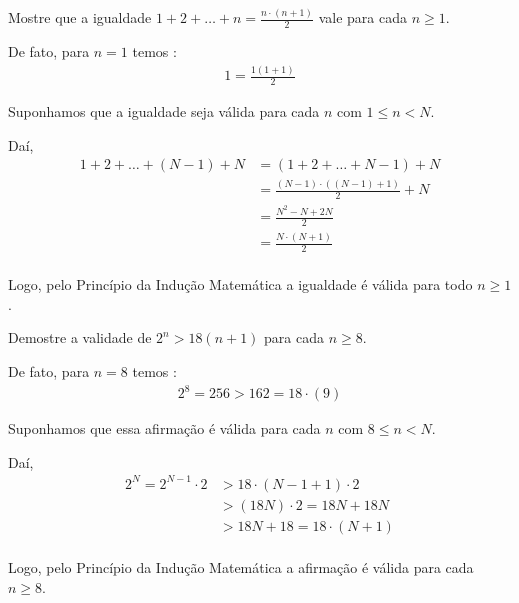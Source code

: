 \begin{exemplo}
Mostre que a igualdade $1+2+\dots+n=\tfrac{n\cdot(n+1)}{2}$ vale para cada $n\ge1$.
\end{exemplo}

De fato, para $n=1$ temos :
\begin{align*}
1 = \frac{1(1+1)}{2}
\end{align*}

Suponhamos que a igualdade seja válida para cada $n$ com $1 \leq n < N$.

Daí,
\begin{align*}
    1+2+\dotsc +(N-1)+N &= (1+2+\dotsc +N-1) + N \\
    &= \frac{(N-1) \cdot ((N-1) + 1)}{2} + N \\
    &= \frac{N^2 - N + 2N}{2} \\
    &= \frac{N \cdot (N+1)}{2} \\
\end{align*}

Logo, pelo Princípio da Indução Matemática a igualdade é válida para todo $n \ge 1$.

\begin{exemplo}[]
Demostre a validade de $2^n > 18(n+1)$ para cada $n \ge 8$.
\end{exemplo}

De fato, para $n = 8$ temos : 
\begin{align*}
2^8 = 256 > 162 = 18\cdot(9)
\end{align*}

Suponhamos que essa afirmação é válida para cada $n$ com $8 \leq n < N$.

Daí,
\begin{align*}
    2^{N} = 2^{N-1} \cdot 2 &> 18 \cdot (N - 1 + 1) \cdot 2 \\
    &> (18N) \cdot 2 = 18N + 18N \\
    &> 18N + 18 = 18 \cdot (N+1) \\
\end{align*}

Logo, pelo Princípio da Indução Matemática a afirmação é válida para cada $n \ge 8$.

\vspace{0.05cm}

